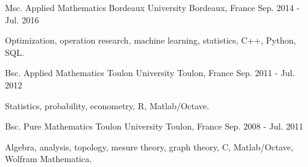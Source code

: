 

\begin{cventries}

  \cventry
    {Msc. Applied Mathematics} %
    {Bordeaux University} %
    {Bordeaux, France} %
    {Sep. 2014 - Jul. 2016} %
    {
      \begin{cvitems} %
        \item {Optimization, operation research, machine learning, statistics, C++, Python, SQL.}
      \end{cvitems}
    }


\cventry
    {Bsc. Applied Mathematics} %
    {Toulon University} %
    {Toulon, France} %
    {Sep. 2011 - Jul. 2012} %
    {
      \begin{cvitems} %
        \item {Statistics, probability, econometry, R, Matlab/Octave.}
      \end{cvitems}
    }


\cventry
    {Bsc. Pure Mathematics} %
    {Toulon University} %
    {Toulon, France} %
    {Sep. 2008 - Jul. 2011} %
    {
      \begin{cvitems} %
        \item {Algebra, analysis, topology, mesure theory, graph theory, C, Matlab/Octave, Wolfram Mathematica.}
      \end{cvitems}
    }



\end{cventries}
